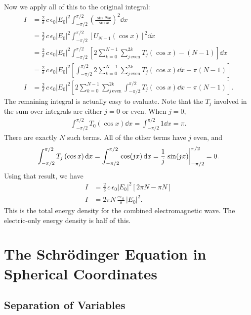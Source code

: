\documentclass[12pt]{article}
\newcommand{\Tn}[2]{T_{#1}\left(#2\right)}
\newcommand{\Un}[2]{U_{#1}\left(#2\right)}
\numberwithin{equation}{section}
\begin{document}
Now we apply all of this to the original integral:
\begin{align*}
I &= \frac{2}{\delta} \, c \, \epsilon_0 |E_0|^2 \int_{-\pi/2}^{\pi/2} \left(\frac{\sin Nx}{\sin x}\right)^2 \dd{x} \\
&= \frac{2}{\delta} \, c \, \epsilon_0 |E_0|^2 \int_{-\pi/2}^{\pi/2} \left[\Un{N-1}{\cos x}\right]^2 \dd{x} \\
&= \frac{2}{\delta} \, c \, \epsilon_0 |E_0|^2 \int_{-\pi/2}^{\pi/2} \left[2 \sum_{k=0}^{N-1} \sum_{j \, \mathrm{even}}^{2k} \Tn{j}{\cos x} - \left(N-1\right) \right] \dd{x} \\
&= \frac{2}{\delta} \, c \, \epsilon_0 |E_0|^2 \left[\int_{-\pi/2}^{\pi/2} 2 \sum_{k=0}^{N-1} \sum_{j \, \mathrm{even}}^{2k} \Tn{j}{\cos x} \dd{x} - \pi\left(N-1\right) \right] \\
I &= \frac{2}{\delta} \, c \, \epsilon_0 |E_0|^2 \left[2 \sum_{k=0}^{N-1} \sum_{j \, \mathrm{even}}^{2k} \int_{-\pi/2}^{\pi/2} \Tn{j}{\cos x} \dd{x} - \pi\left(N-1\right) \right].
\end{align*}
The remaining integral is actually easy to evaluate. Note that the $T_j$ involved in the sum over integrals are either $j=0$ or even. When $j=0$,
\begin{align*}
\int_{-\pi/2}^{\pi/2} T_0(\cos x) \dd{x} = \int_{-\pi/2}^{\pi/2} 1 \dd{x} = \pi.
\end{align*}
There are exactly $N$ such terms. All of the other terms have $j$ even, and
\begin{align*}
\int_{-\pi/2}^{\pi/2} \Tn{j}{\cos x} \dd{x} = \int_{-\pi/2}^{\pi/2} \cos(jx) \dd{x} = \frac{1}{j} \eval{\sin(jx)}_{-\pi/2}^{\pi/2} = 0.
\end{align*}
Using that result, we have
\begin{align*}
I &= \frac{2}{\delta} \, c \, \epsilon_0 |E_0|^2 \left[2 \pi N  - \pi N \right] \\
I &= 2\pi N \, \frac{c \, \epsilon_0}{\delta} \,  |E_0|^2.
\end{align*}
This is the total energy density for the combined electromagnetic wave. The electric-only energy density is half of this.



\newpage
\section{The Schr\"{o}dinger Equation in Spherical Coordinates}

\subsection{Separation of Variables}
\end{document}
